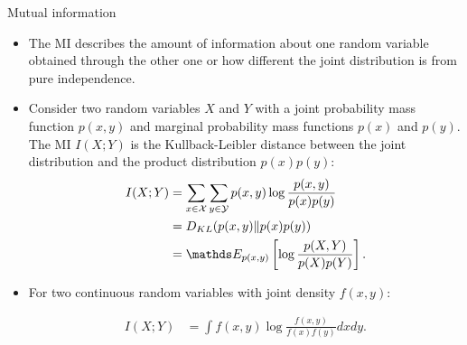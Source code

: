 \begin{vbframe} {Mutual information}

% 

\begin{itemize}
\item The MI describes the amount of information about one random variable obtained through the other one or how different the joint distribution is from pure independence.
\item Consider two random variables $X$ and $Y$ with a joint probability mass function $p(x, y)$ and marginal probability mass functions $p(x)$ and $p(y)$. The MI $I (X;Y)$ is the Kullback-Leibler distance between the joint distribution and the product distribution $p(x)p(y)$:
\footnotesize
\begin{equation*}\begin{aligned}
I(X ; Y) &=\sum_{x \in \Xspace} \sum_{y \in \Yspace} p(x, y) \log \frac{p(x, y)}{p(x) p(y)} \\
&=D_{KL}(p(x, y) \| p(x) p(y)) \\
&=\E_{p(x, y)} \left[ \log \frac{p(X, Y)}{p(X) p(Y)} \right].
\end{aligned}\end{equation*}
\normalsize

\item For two continuous random variables with joint density $f(x,y)$:

\footnotesize
\begin{equation*}\begin{aligned}
I(X ; Y) &= \int f(x,y) \log \frac{f(x,y)}{f(x)f(y)} dx dy.
\end{aligned}
\end{equation*}
\normalsize

\end{itemize}

\end{vbframe}


